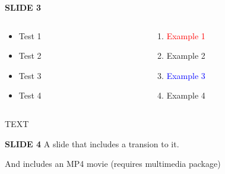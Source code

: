 \documentclass[11pt,vertical]{beamer}
\begin{document}
\begin{frame}{\small \textbf{SLIDE 3}}
    \transfade
	\small
	\begin{columns}
	
		\begin{column}[t]{0.4\textwidth}
			\begin{itemize}
				\item Test 1
				\item Test 2
				\item Test 3
				\item Test 4
			\end{itemize}
		\end{column}
		
		\begin{column}[t]{0.4\textwidth}
			\begin{enumerate}
				\item \textcolor{red}{Example 1}
				\item \textcolor{HBRS}{Example 2}
				\item \textcolor{blue}{Example 3}
				\item Example 4
			\end{enumerate}
		\end{column}
		
	\end{columns}
	\vfill
	\hhline
	\LARGE
	TEXT
	\vfill


\end{frame}


\begin{frame}{\small \textbf{SLIDE 4}}
    \transfade
    A slide that includes a transion to it.

    And includes an MP4 movie (requires \textcolor{HBRS}{multimedia} package)

    \bigskip
    \centering

\end{frame}


\end{document}
